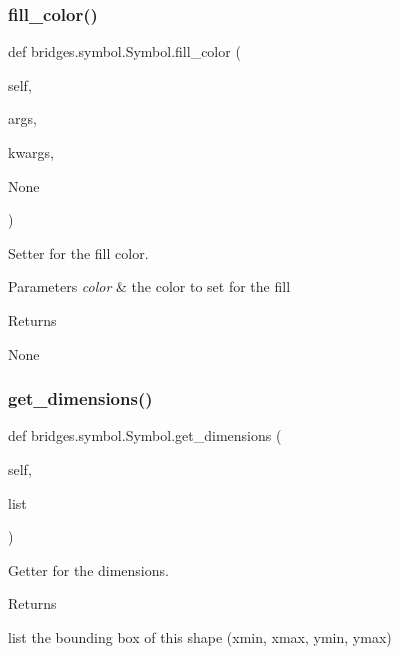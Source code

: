 \subsubsection{\texorpdfstring{fill\+\_\+color()}{fill\_color()}\hspace{0.1cm}{\footnotesize\ttfamily [2/2]}}
{\footnotesize\ttfamily def bridges.\+symbol.\+Symbol.\+fill\+\_\+color (\begin{DoxyParamCaption}\item[{}]{self,  }\item[{}]{args,  }\item[{}]{kwargs,  }\item[{}]{None }\end{DoxyParamCaption})}



Setter for the fill color. 


\begin{DoxyParams}{Parameters}
{\em color} & the color to set for the fill \\
\hline
\end{DoxyParams}
\begin{DoxyReturn}{Returns}


None 
\end{DoxyReturn}
\mbox{\label{classbridges_1_1symbol_1_1_symbol_ae53057317f11148bbbf7c17c671cac2d}} 
\subsubsection{\texorpdfstring{get\+\_\+dimensions()}{get\_dimensions()}}
{\footnotesize\ttfamily def bridges.\+symbol.\+Symbol.\+get\+\_\+dimensions (\begin{DoxyParamCaption}\item[{}]{self,  }\item[{}]{list }\end{DoxyParamCaption})}



Getter for the dimensions. 

\begin{DoxyReturn}{Returns}


list the bounding box of this shape (xmin, xmax, ymin, ymax) 
\end{DoxyReturn}
\mbox{\label{classbridges_1_1symbol_1_1_symbol_a746f8e6d1fd1c63c8a9140a2af7436f8}} 
